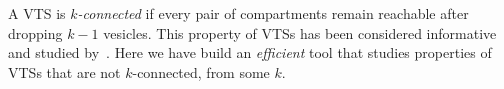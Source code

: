 %

A VTS is {\em $k$-connected} if every pair of compartments remain
reachable after dropping $k-1$ vesicles.
%
This property of VTSs has been considered informative and
studied by~\cite{shukla}.
%
Here we have build an {\em efficient} tool that studies properties of
VTSs that are not $k$-connected, from some $k$. 



